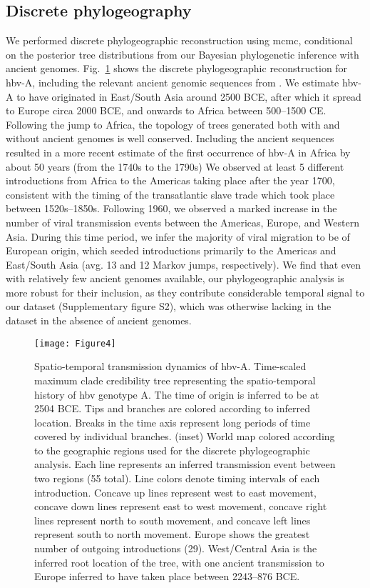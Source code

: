 \subsection{Discrete phylogeography}
We performed discrete phylogeographic reconstruction using \gls{mcmc}, conditional on the posterior tree distributions from our Bayesian phylogenetic inference with ancient genomes.
Fig.~\ref{fig:3-4} shows the discrete phylogeographic reconstruction for \gls{hbv}-A, including the relevant ancient genomic sequences from \citet{muhlemann_ancient_2018}.
We estimate \gls{hbv}-A to have originated in East/South Asia around 2500 BCE, after which it spread to Europe circa 2000 BCE, and onwards to Africa between 500--1500 CE.
Following the jump to Africa, the topology of trees generated both with and without ancient genomes is well conserved.
Including the ancient sequences resulted in a more recent estimate of the first occurrence of \gls{hbv}-A in Africa by about 50 years (from the 1740s to the 1790s)
We observed at least 5 different introductions from Africa to the Americas taking place after the year 1700, consistent with the timing of the transatlantic slave trade which took place between 1520s--1850s.
Following 1960, we observed a marked increase in the number of viral transmission events between the Americas, Europe, and Western Asia.
During this time period, we infer the majority of viral migration to be of European origin, which seeded introductions primarily to the Americas and East/South Asia (avg. 13 and 12 Markov jumps, respectively).
We find that even with relatively few ancient genomes available, our phylogeographic analysis is more robust for their inclusion, as they contribute considerable temporal signal to our dataset (Supplementary figure S2), which was otherwise lacking in the dataset in the absence of ancient genomes.

\begin{figure}[ht]
  \centering
  \texttt{[image: Figure4]}
  \caption[HBV-A phylogeography]{Spatio-temporal transmission dynamics of \gls{hbv}-A. Time-scaled maximum clade credibility tree representing the spatio-temporal history of \gls{hbv} genotype A. The time of origin is inferred to be at 2504 BCE. Tips and branches are colored according to inferred location. Breaks in the time axis represent long periods of time covered by individual branches. (inset) World map colored according to the geographic regions used for the discrete phylogeographic analysis. Each line represents an inferred transmission event between two regions (55 total). Line colors denote timing intervals of each introduction. Concave up lines represent west to east movement, concave down lines represent east to west movement, concave right lines represent north to south movement, and concave left lines represent south to north movement. Europe shows the greatest number of outgoing introductions (29). West/Central Asia is the inferred root location of the tree, with one ancient transmission to Europe inferred to have taken place between 2243--876 BCE.}
  \label{fig:3-4}
\end{figure}

